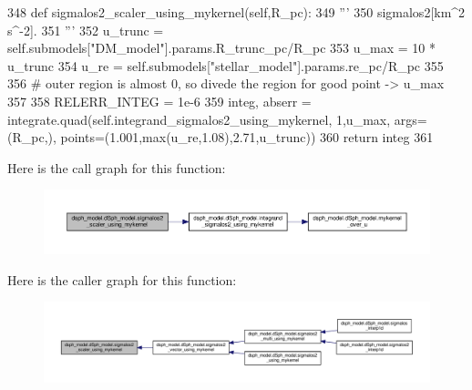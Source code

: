\begin{DoxyCode}
348     \textcolor{keyword}{def }sigmalos2\_scaler\_using\_mykernel(self,R\_pc):
349         \textcolor{stringliteral}{'''}
350 \textcolor{stringliteral}{        sigmalos2[km^2 s^-2].}
351 \textcolor{stringliteral}{        '''}
352         u\_trunc = self.submodels[\textcolor{stringliteral}{"DM\_model"}].params.R\_trunc\_pc/R\_pc
353         u\_max = 10 * u\_trunc
354         u\_re = self.submodels[\textcolor{stringliteral}{"stellar\_model"}].params.re\_pc/R\_pc
355 
356         \textcolor{comment}{# outer region is almost 0, so divede the region for good point -> u\_max}
357         
358         RELERR\_INTEG = 1e-6
359         integ, abserr =  integrate.quad(self.integrand\_sigmalos2\_using\_mykernel, 1,u\_max, args=(R\_pc,),
      points=(1.001,max(u\_re,1.08),2.71,u\_trunc))
360         \textcolor{keywordflow}{return} integ
361     
\end{DoxyCode}
Here is the call graph for this function\+:
\nopagebreak
\begin{figure}[H]
\begin{center}
\leavevmode
\includegraphics[width=350pt]{d0/d25/classdsph__model_1_1dSph__model_a14692f81c0bffc790d5daf7f4e6464c1_cgraph}
\end{center}
\end{figure}
Here is the caller graph for this function\+:
\nopagebreak
\begin{figure}[H]
\begin{center}
\leavevmode
\includegraphics[width=350pt]{d0/d25/classdsph__model_1_1dSph__model_a14692f81c0bffc790d5daf7f4e6464c1_icgraph}
\end{center}
\end{figure}
\mbox{\label{classdsph__model_1_1dSph__model_a4e062f0ac546057c1109fd47ec39ed90}} 
